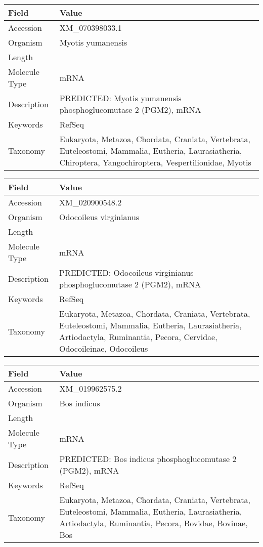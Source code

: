 \documentclass[10pt]{article}
\begin{document}
{\footnotesize
\begin{longtable}{>{\raggedright\arraybackslash}p{4.5cm} >{\raggedright\arraybackslash}p{11.5cm}}
\textbf{Field} & \textbf{Value} \\
\hline
Accession & XM\_070398033.1 \\
Organism & Myotis yumanensis \\
Length & 1996 \\
Molecule Type & mRNA \\
Description & PREDICTED: Myotis yumanensis phosphoglucomutase 2 (PGM2), mRNA \\
Keywords & RefSeq \\
Taxonomy & Eukaryota, Metazoa, Chordata, Craniata, Vertebrata, Euteleostomi, Mammalia, Eutheria, Laurasiatheria, Chiroptera, Yangochiroptera, Vespertilionidae, Myotis \\
\end{longtable}
}

{\footnotesize
\begin{longtable}{>{\raggedright\arraybackslash}p{4.5cm} >{\raggedright\arraybackslash}p{11.5cm}}
\textbf{Field} & \textbf{Value} \\
\hline
Accession & XM\_020900548.2 \\
Organism & Odocoileus virginianus \\
Length & 4172 \\
Molecule Type & mRNA \\
Description & PREDICTED: Odocoileus virginianus phosphoglucomutase 2 (PGM2), mRNA \\
Keywords & RefSeq \\
Taxonomy & Eukaryota, Metazoa, Chordata, Craniata, Vertebrata, Euteleostomi, Mammalia, Eutheria, Laurasiatheria, Artiodactyla, Ruminantia, Pecora, Cervidae, Odocoileinae, Odocoileus \\
\end{longtable}
}

{\footnotesize
\begin{longtable}{>{\raggedright\arraybackslash}p{4.5cm} >{\raggedright\arraybackslash}p{11.5cm}}
\textbf{Field} & \textbf{Value} \\
\hline
Accession & XM\_019962575.2 \\
Organism & Bos indicus \\
Length & 7359 \\
Molecule Type & mRNA \\
Description & PREDICTED: Bos indicus phosphoglucomutase 2 (PGM2), mRNA \\
Keywords & RefSeq \\
Taxonomy & Eukaryota, Metazoa, Chordata, Craniata, Vertebrata, Euteleostomi, Mammalia, Eutheria, Laurasiatheria, Artiodactyla, Ruminantia, Pecora, Bovidae, Bovinae, Bos \\
\end{longtable}
}
\end{document}
